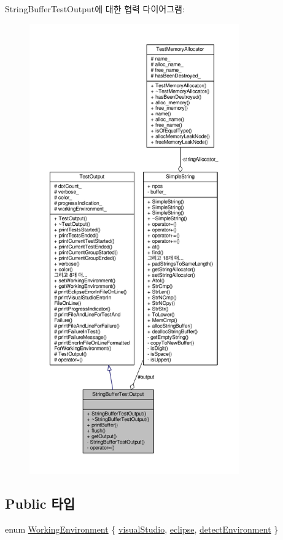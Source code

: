 String\+Buffer\+Test\+Output에 대한 협력 다이어그램\+:
\nopagebreak
\begin{figure}[H]
\begin{center}
\leavevmode
\includegraphics[height=550pt]{class_string_buffer_test_output__coll__graph}
\end{center}
\end{figure}
\subsection*{Public 타입}
\begin{DoxyCompactItemize}
\item 
enum \hyperlink{class_test_output_a0541851f863713454486a9fb3080f766}{Working\+Environment} \{ \hyperlink{class_test_output_a0541851f863713454486a9fb3080f766a47f3a5b9ed4237588024b983a4ca8399}{visual\+Studio}, 
\hyperlink{class_test_output_a0541851f863713454486a9fb3080f766abf6505364f680c2682d5648cd0c76f53}{eclipse}, 
\hyperlink{class_test_output_a0541851f863713454486a9fb3080f766a3f11f791db94db142e33c3c75442ed10}{detect\+Environment}
 \}
\end{DoxyCompactItemize}
